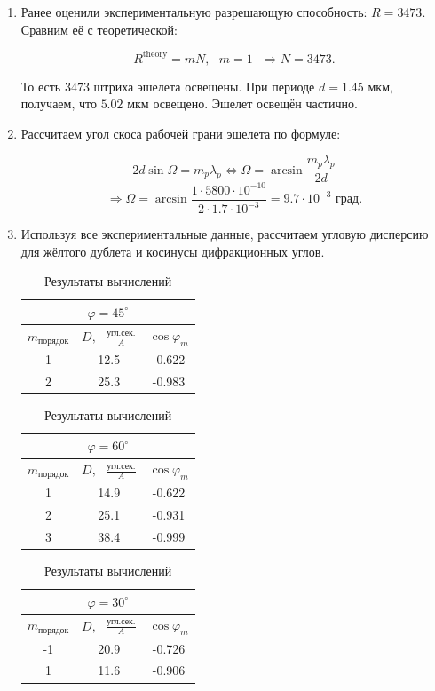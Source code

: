 \documentclass[a4paper,12pt]{article} %
\begin{document}
\begin{enumerate}
    \item Ранее оценили экспериментальную разрешающую способность: $R = 3473$. Сравним её с теоретической:

    \[ R^{\text{theory}}=mN, \text{ }m=1\text{ } \Longrightarrow N = 3473. \]

    То есть $3473$ штриха эшелета освещены. При периоде $d=1.45\text{ мкм}$, получаем, что $5.02\text{ мкм}$ освещено. Эшелет освещён частично.

    \item Рассчитаем угол скоса рабочей грани эшелета по формуле:

    \[ 2d\sin{\Omega}=m_p\lambda_p \Leftrightarrow \Omega=\arcsin{\frac{m_p\lambda_p}{2d}} \]
    \[ \Longrightarrow \Omega=\arcsin{\frac{1\cdot5800\cdot10^{-10}}{2\cdot1.7\cdot10^{-3}}} = 9.7\cdot10^{-3} \text{ град.} \]

    \item Используя все экспериментальные данные, рассчитаем угловую дисперсию для жёлтого дублета и косинусы дифракционных углов.

    \begin{table}[h]
        \centering
        \begin{tabular}{|c|c|c|}
        \hline
            \multicolumn{3}{|c|}{$\varphi=45^{\circ}$} \\ \hline
        \hline
        $m_{\text{порядок}}$ & $D, \text{ }\frac{\text{угл.сек.}}{A}$ & $\cos{\varphi_m}$ \\ \hline
            1 & 12.5 & -0.622 \\ \hline
            2 & 25.3 & -0.983 \\ \hline
        \end{tabular}
        \begin{tabular}{|c|c|c|}
        \hline
            \multicolumn{3}{|c|}{$\varphi=60^{\circ}$} \\ \hline
        \hline
        $m_{\text{порядок}}$ & $D, \text{ }\frac{\text{угл.сек.}}{A}$ & $\cos{\varphi_m}$ \\ \hline
            1 & 14.9 & -0.622 \\ \hline
            2 & 25.1 & -0.931 \\ \hline
            3 & 38.4 & -0.999 \\ \hline
        \end{tabular}
        \begin{tabular}{|c|c|c|}
        \hline
            \multicolumn{3}{|c|}{$\varphi=30^{\circ}$} \\ \hline
        \hline
        $m_{\text{порядок}}$ & $D, \text{ }\frac{\text{угл.сек.}}{A}$ & $\cos{\varphi_m}$ \\ \hline
            -1 & 20.9 & -0.726 \\ \hline
            1 & 11.6 & -0.906 \\ \hline
        \end{tabular}
    \caption{Результаты вычислений}
    \label{tab2}
    \end{table}


\end{enumerate}
\end{document}
